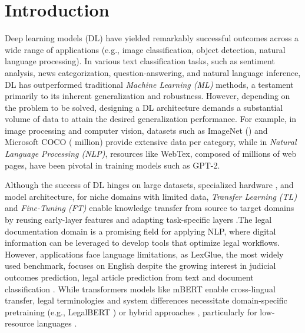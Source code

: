 \documentclass[runningheads]{llncs}
\begin{document}
\section{Introduction}
Deep learning models (DL) have yielded remarkably
successful outcomes across a wide range of applications (e.g., image
classification, object detection, natural language
processing)\cite{PATHAK20181706}. In various text classification
tasks, such as sentiment analysis, news categorization,
question-answering, and natural language inference, DL has outperformed
traditional \emph{Machine Learning (ML)}  methods\cite{Minaee2021}, a
testament primarily to its inherent generalization and
robustness\cite{Zahangir2018}. However, depending on the problem
to be solved, designing a DL architecture demands a substantial volume
of data to attain the desired generalization performance. For example,
in image processing and computer vision, datasets such as ImageNet
() and Microsoft COCO ( million)
provide extensive data per category\cite{PATHAK20181706}, while in
\emph{Natural Language Processing (NLP)}, resources like WebTex, composed of
millions of web pages, have been pivotal in training models such as
GPT-2\cite{radford2019language}.

Although the success of DL hinges on large datasets, specialized
hardware \cite{radford2019language}\cite{murphy2022probabilistic}, and
model architecture, for niche domains with limited data,
\emph{Transfer Learning (TL)} and \emph{Fine-Tuning (FT)} enable
knowledge transfer from source to target domains by reusing
early-layer features and adapting task-specific layers
\cite{yosinski2014transferable}\cite{howard2018universallanguagemodelfinetuning}.The
legal documentation domain is a promising field for applying NLP,
where digital information can be leveraged to develop tools that
optimize legal workflows. However, applications face language
limitations, as LexGlue, the most widely used benchmark, focuses on
English despite the growing interest in judicial outcomes
prediction\cite{mumcuouglu2021natural,kalia2022classifying,wang2020deep},
legal article prediction from text and document classification
\cite{yan2019law,clavie2021}. While transformers models like mBERT
enable cross-lingual transfer, legal terminologies and system
differences necessitate domain-specific
pretraining (e.g., LegalBERT \cite{chalkidis2020legal}) or hybrid
approaches \cite{liu2022legal}, particularly for low-resource
languages \cite{savelka2021cross}.
\end{document}

